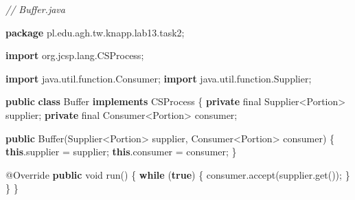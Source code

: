\documentclass[11pt]{article}
\newenvironment{Shaded}{}{}
\newcommand{\KeywordTok}[1]{\textcolor[rgb]{0.00,0.44,0.13}{\textbf{{#1}}}}
\newcommand{\DataTypeTok}[1]{\textcolor[rgb]{0.56,0.13,0.00}{{#1}}}
\newcommand{\CommentTok}[1]{\textcolor[rgb]{0.38,0.63,0.69}{\textit{{#1}}}}
\newcommand{\FunctionTok}[1]{\textcolor[rgb]{0.02,0.16,0.49}{{#1}}}
\newcommand{\NormalTok}[1]{{#1}}
\newcommand{\ImportTok}[1]{{#1}}
\newcommand{\ControlFlowTok}[1]{\textcolor[rgb]{0.00,0.44,0.13}{\textbf{{#1}}}}
\newcommand{\OperatorTok}[1]{\textcolor[rgb]{0.40,0.40,0.40}{{#1}}}
\newcommand{\BuiltInTok}[1]{{#1}}
\newcommand{\AttributeTok}[1]{\textcolor[rgb]{0.49,0.56,0.16}{{#1}}}
\begin{document}
    \begin{Shaded}
\begin{Highlighting}[]
\CommentTok{// Buffer.java}

\KeywordTok{package}\ImportTok{ pl}\OperatorTok{.}\ImportTok{edu}\OperatorTok{.}\ImportTok{agh}\OperatorTok{.}\ImportTok{tw}\OperatorTok{.}\ImportTok{knapp}\OperatorTok{.}\ImportTok{lab13}\OperatorTok{.}\ImportTok{task2}\OperatorTok{;}

\KeywordTok{import} \ImportTok{org}\OperatorTok{.}\ImportTok{jcsp}\OperatorTok{.}\ImportTok{lang}\OperatorTok{.}\ImportTok{CSProcess}\OperatorTok{;}

\KeywordTok{import} \ImportTok{java}\OperatorTok{.}\ImportTok{util}\OperatorTok{.}\ImportTok{function}\OperatorTok{.}\ImportTok{Consumer}\OperatorTok{;}
\KeywordTok{import} \ImportTok{java}\OperatorTok{.}\ImportTok{util}\OperatorTok{.}\ImportTok{function}\OperatorTok{.}\ImportTok{Supplier}\OperatorTok{;}

\KeywordTok{public} \KeywordTok{class} \BuiltInTok{Buffer} \KeywordTok{implements}\NormalTok{ CSProcess }\OperatorTok{\{}
    \KeywordTok{private} \DataTypeTok{final}\NormalTok{ Supplier}\OperatorTok{\textless{}}\NormalTok{Portion}\OperatorTok{\textgreater{}}\NormalTok{ supplier}\OperatorTok{;}
    \KeywordTok{private} \DataTypeTok{final}\NormalTok{ Consumer}\OperatorTok{\textless{}}\NormalTok{Portion}\OperatorTok{\textgreater{}}\NormalTok{ consumer}\OperatorTok{;}

    \KeywordTok{public} \BuiltInTok{Buffer}\OperatorTok{(}\NormalTok{Supplier}\OperatorTok{\textless{}}\NormalTok{Portion}\OperatorTok{\textgreater{}}\NormalTok{ supplier}\OperatorTok{,}\NormalTok{ Consumer}\OperatorTok{\textless{}}\NormalTok{Portion}\OperatorTok{\textgreater{}}\NormalTok{ consumer}\OperatorTok{)} \OperatorTok{\{}
        \KeywordTok{this}\OperatorTok{.}\FunctionTok{supplier} \OperatorTok{=}\NormalTok{ supplier}\OperatorTok{;}
        \KeywordTok{this}\OperatorTok{.}\FunctionTok{consumer} \OperatorTok{=}\NormalTok{ consumer}\OperatorTok{;}
    \OperatorTok{\}}

    \AttributeTok{@Override}
    \KeywordTok{public} \DataTypeTok{void} \FunctionTok{run}\OperatorTok{()} \OperatorTok{\{}
        \ControlFlowTok{while} \OperatorTok{(}\KeywordTok{true}\OperatorTok{)} \OperatorTok{\{}
\NormalTok{            consumer}\OperatorTok{.}\FunctionTok{accept}\OperatorTok{(}\NormalTok{supplier}\OperatorTok{.}\FunctionTok{get}\OperatorTok{());}
        \OperatorTok{\}}
    \OperatorTok{\}}
\OperatorTok{\}}
\end{Highlighting}
\end{Shaded}
\end{document}
